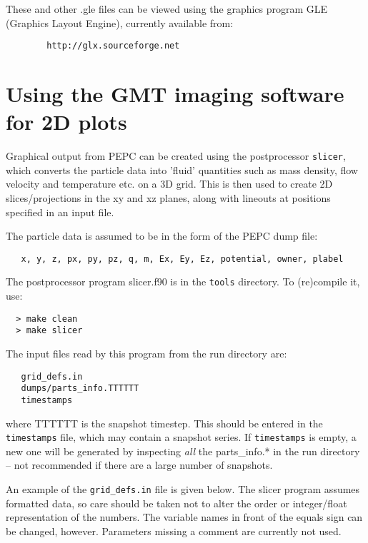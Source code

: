 \documentclass[11pt,psfig]{article}
\newcommand{\meno}{{\medskip\noindent}}
\begin{document}
\noindent
These and other .gle files can be viewed using the graphics program GLE
(Graphics Layout Engine), currently available from:

\begin{verbatim}
        http://glx.sourceforge.net
\end{verbatim}



\section{Using the GMT imaging software for 2D plots}

\noindent
Graphical output from PEPC can be created using the
postprocessor \texttt{slicer}, which converts the particle data into
'fluid' quantities such as mass density, flow velocity and temperature
etc. on a 3D grid.  This is then used to create 2D slices/projections
in the xy and xz planes, along with lineouts at positions specified in
an input file.

\meno
The particle data is assumed to be in the form of the PEPC dump file:

\begin{verbatim}
   x, y, z, px, py, pz, q, m, Ex, Ey, Ez, potential, owner, plabel
\end{verbatim}

\noindent
The postprocessor program slicer.f90 is in the \texttt{tools} directory.  To
(re)compile it, use:

\begin{verbatim}
  > make clean 
  > make slicer
\end{verbatim}

\noindent 
The input files read by this program from the run directory are:

\begin{verbatim}
   grid_defs.in
   dumps/parts_info.TTTTTT
   timestamps
\end{verbatim}

\noindent
where TTTTTT is the snapshot timestep.  This should be entered in the
\texttt{timestamps} file, which may contain a snapshot series.  If \texttt{timestamps}
is empty, a new one will be generated by inspecting \textit{all} the
parts_info.* in the run directory -- not recommended if there are a large
number of snapshots.


\meno
An example of the \texttt{grid_defs.in} file is given below.  The slicer
program assumes formatted data, so care should be taken not to alter
the order or integer/float representation of the numbers.  The
variable names in front of the equals sign can be changed, however.
Parameters missing a comment are currently not used.
\end{document}
